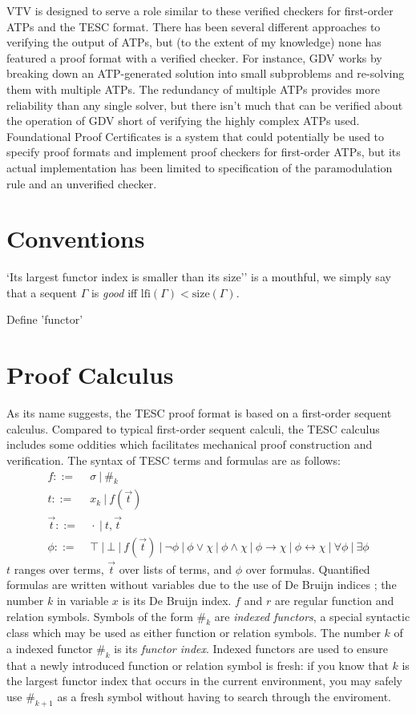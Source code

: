 \documentclass[12pt]{article}
\newcommand{\idf}[1]{\#_{#1}}
\newcommand{\size}[0]{\mathrm{size}}
\newcommand{\lfi}[0]{\mathrm{lfi}}
\begin{document}
VTV is designed to serve a role similar to these verified checkers for first-order ATPs
and the TESC format.
There has been several different approaches to verifying the output of ATPs, but (to the
extent of my knowledge) none has featured a proof format with a verified checker. 
For instance, GDV \cite{} works by breaking down an ATP-generated solution into small 
subproblems and re-solving them with multiple ATPs. The redundancy of multiple ATPs 
provides more reliability than any single solver, but there isn't much that can be 
verified about the operation of GDV short of verifying the highly complex ATPs used.  
Foundational Proof Certificates \cite{} is a system that could potentially be used to 
specify proof formats and implement proof checkers for first-order ATPs, but its actual 
implementation has been limited to specification of the paramodulation rule and an 
unverified checker.



\section{Conventions}

`Its largest functor index is smaller than its size'' is a mouthful, we 
simply say that a sequent $\Gamma$ is \textit{good} iff $\lfi(\Gamma) < \size(\Gamma)$.

Define 'functor'

\section{Proof Calculus} \label{sec:format} 

As its name suggests, the TESC proof format is based on a first-order 
sequent calculus. Compared to typical first-order sequent calculi, the
TESC calculus includes some oddities which facilitates mechanical proof 
construction and verification. The syntax of TESC terms and formulas are 
as follows:
\begin{align*}
f ::= &\ \sigma\ |\ \idf{k}\\
t ::= &\ x_k\ |\ f(\vec{t})\\
\vec{t} ::= &\ \cdot\ |\ t, \vec{t}\\
\phi ::= &\ \top\ |\ \bot\ |\ f(\vec{t})\ |\ \lnot \phi\ |\ \phi \lor \chi\ |\ \phi \land \chi\ |\ \phi \to \chi\ |\ \phi \leftrightarrow \chi\ |\ \forall \phi\ |\ \exists \phi
\end{align*}
$t$ ranges over terms, $\vec{t}$ over lists of terms, and $\phi$ over formulas.
Quantified formulas are written without variables due to the use of De Bruijn 
indices \cite{}; the number $k$ in variable $x$ is its De Bruijn index. 
$f$ and $r$ are regular function and relation symbols. Symbols of the 
form $\idf{k}$ are \textit{indexed functors}, a special syntactic class
which may be used as either function or relation symbols. The number $k$ of 
a indexed functor $\idf{k}$ is its \textit{functor index}. Indexed 
functors are used to ensure that a newly introduced function or relation 
symbol is fresh: if you know that $k$ is the largest functor index that 
occurs in the current environment, you may safely use $\idf{k+1}$ as a 
fresh symbol without having to search through the enviroment.
\end{document}
